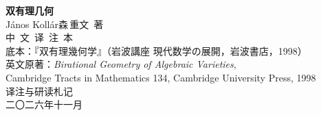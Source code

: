 \thispagestyle{empty}
\begin{center}
\vspace*{2.6cm}
{\Huge\bfseries 双有理几何}\\[1.6em]
{\large János Kollár\quad 森\,重文\ 著}\\[1.2em]
{\large 中\ 文\ 译\ 注\ 本}\\[4.5em]
{\small 底本：『双有理幾何学』（岩波講座 現代数学の展開，岩波書店，1998）}\\[0.6em]
{\small 英文原著：\emph{Birational Geometry of Algebraic Varieties},}\\
{\small Cambridge Tracts in Mathematics 134, Cambridge University Press, 1998}\\[4.5em]
{\small 译注与研读札记}\\[0.4em]
{\small 二〇二六年十一月}
\end{center}
\clearpage
